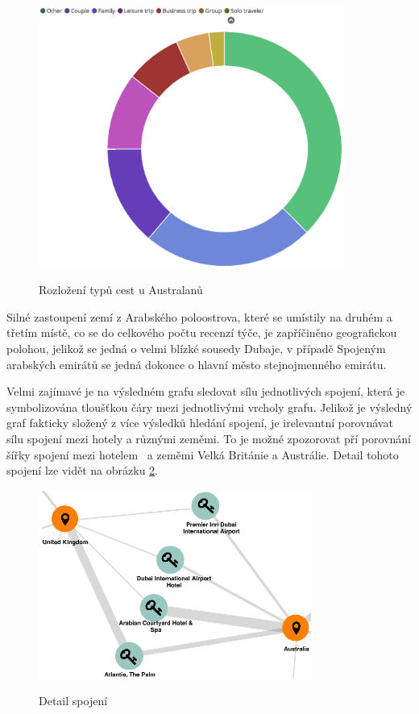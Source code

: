 \documentclass[czech,BP]{thesiskiv}
\begin{document}
\begin{figure} [h]
	\centering
	\includegraphics[width=10cm]{img/australia.eps}
	\label{fig:rozlozeniAustralanu}
	\caption{Rozložení typů cest u Australanů}
\end{figure}


Silné zastoupení zemí z Arabského poloostrova, které se umístily na druhém a třetím místě, co se do celkového počtu recenzí týče, je zapříčiněno geografickou polohou, jelikož se jedná o velmi blízké sousedy Dubaje, v případě Spojeným arabských emirátů se jedná dokonce o hlavní město stejnojmenného emirátu.


Velmi zajímavé je na výsledném grafu sledovat sílu jednotlivých spojení, která je symbolizována tloušťkou čáry mezi jednotlivými vrcholy grafu. Jelikož je výsledný graf fakticky složený z více výsledků hledání spojení, je irelevantní porovnávat sílu spojení mezi hotely a různými zeměmi. To je možné zpozorovat pří porovnání šířky spojení mezi hotelem ~a zeměmi Velká Británie a Austrálie. Detail tohoto spojení lze vidět na obrázku \ref{fig:DetailSpojeni1}.

\begin{figure} [htbp]
	\centering
	\includegraphics[width= 0.8\textwidth]{img/detail_spojeni.eps}
	\label{fig:DetailSpojeni1}
	\caption{Detail spojení}
\end{figure}
\end{document}

